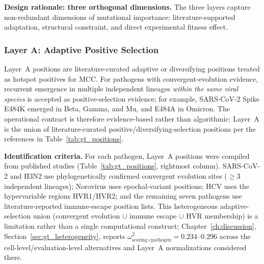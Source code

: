 \textbf{Design rationale: three orthogonal dimensions.}
The three layers capture non-redundant dimensions of mutational importance: literature-supported adaptation, structural constraint, and direct experimental fitness effect.

\begin{table}[htbp]
\centering
\caption{Evaluation role of the three ground-truth layers.}
\label{tab:gt_layer_roles}
\small
{}
\end{table}

\subsubsection{Layer A: Adaptive Positive Selection}
\label{subsec:layer_a}

Layer~A positions are literature-curated adaptive or diversifying positions treated as hotspot positives for MCC.
For pathogens with convergent-evolution evidence, recurrent emergence in multiple independent lineages \textit{within the same viral species} is accepted as positive-selection evidence; for example, SARS-CoV-2 Spike E484K emerged in Beta, Gamma, and Mu, and E484A in Omicron.
The operational contract is therefore evidence-based rather than algorithmic: Layer~A is the union of literature-curated positive/diversifying-selection positions per the references in Table~\ref{tab:gt_positions}.

\textbf{Identification criteria.}
For each pathogen, Layer~A positions were compiled from published studies (Table~\ref{tab:gt_positions}, rightmost column). SARS-CoV-2 and H3N2 use phylogenetically confirmed convergent evolution sites ($\geq$3 independent lineages); Norovirus uses epochal-variant positions; HCV uses the hypervariable regions HVR1/HVR2; and the remaining seven pathogens use literature-reported immune-escape position lists. This heterogeneous adaptive-selection union (convergent evolution $\cup$ immune escape $\cup$ HVR membership) is a limitation rather than a single computational construct; Chapter~\ref{ch:discussion}, Section~\ref{sec:gt_heterogeneity}, reports $\omega^2_{\text{scoring} \times \text{pathogen}} = 0.234$--$0.296$ across the cell-level/evaluation-level alternatives and Layer~A normalizations considered there.

